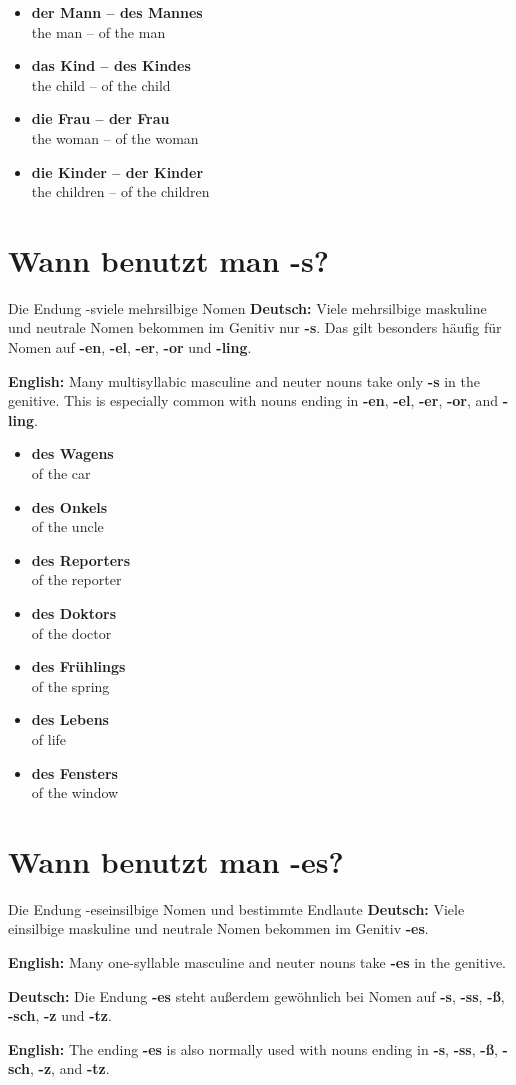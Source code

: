 \documentclass[a4paper,11pt]{article}
\newcommand{\GermanText}[1]{\textbf{Deutsch: }#1\par}
\newcommand{\EnglishText}[1]{{\small\color{SoftGray}\textbf{English: }#1\par}}
\newcommand{\ExampleItem}[2]{\item \textbf{#1}\\{\small\color{SoftGray}#2}}
\begin{document}
        \begin{exbox}
            \begin{itemize}
                \ExampleItem{der Mann -- des Mannes}{the man -- of the man}
                \ExampleItem{das Kind -- des Kindes}{the child -- of the child}
                \ExampleItem{die Frau -- der Frau}{the woman -- of the woman}
                \ExampleItem{die Kinder -- der Kinder}{the children -- of the children}
            \end{itemize}
        \end{exbox}

    \section{Wann benutzt man -s?}

        \begin{grammarentry}{Die Endung -s}{viele mehrsilbige Nomen}
            \GermanText{Viele mehrsilbige maskuline und neutrale Nomen bekommen im Genitiv nur \textbf{-s}. Das gilt besonders häufig für Nomen auf \textbf{-en}, \textbf{-el}, \textbf{-er}, \textbf{-or} und \textbf{-ling}.}
            \EnglishText{Many multisyllabic masculine and neuter nouns take only \textbf{-s} in the genitive. This is especially common with nouns ending in \textbf{-en}, \textbf{-el}, \textbf{-er}, \textbf{-or}, and \textbf{-ling}.}
        \end{grammarentry}

        \begin{exbox}
            \begin{itemize}
                \ExampleItem{des Wagens}{of the car}
                \ExampleItem{des Onkels}{of the uncle}
                \ExampleItem{des Reporters}{of the reporter}
                \ExampleItem{des Doktors}{of the doctor}
                \ExampleItem{des Frühlings}{of the spring}
                \ExampleItem{des Lebens}{of life}
                \ExampleItem{des Fensters}{of the window}
            \end{itemize}
        \end{exbox}

    \section{Wann benutzt man -es?}

        \begin{grammarentry}{Die Endung -es}{einsilbige Nomen und bestimmte Endlaute}
            \GermanText{Viele einsilbige maskuline und neutrale Nomen bekommen im Genitiv \textbf{-es}.}
            \EnglishText{Many one-syllable masculine and neuter nouns take \textbf{-es} in the genitive.}

            \GermanText{Die Endung \textbf{-es} steht außerdem gewöhnlich bei Nomen auf \textbf{-s}, \textbf{-ss}, \textbf{-ß}, \textbf{-sch}, \textbf{-z} und \textbf{-tz}.}
            \EnglishText{The ending \textbf{-es} is also normally used with nouns ending in \textbf{-s}, \textbf{-ss}, \textbf{-ß}, \textbf{-sch}, \textbf{-z}, and \textbf{-tz}.}
        \end{grammarentry}
\end{document}
